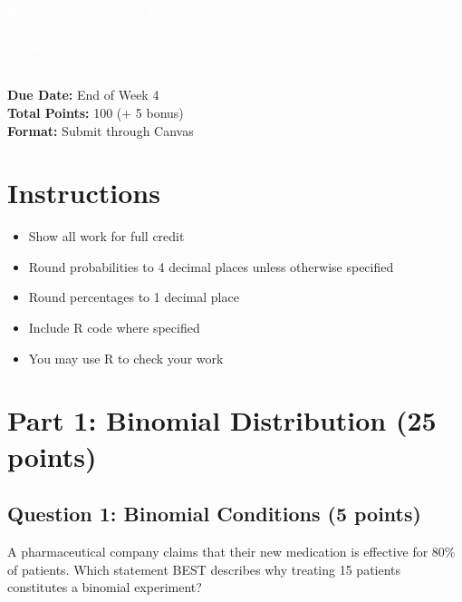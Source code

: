 \documentclass[11pt]{article}
\title{}
\author{}
\date{}
\begin{document}
\begin{tcolorbox}[colback=osaorange,colframe=black,boxrule=2pt,arc=0pt,left=3pt,right=3pt,top=6pt,bottom=6pt,boxsep=2pt]
\centering
\textcolor{white}{\textbf{\Large H524 Introduction to Biostatistics}}\\
\textcolor{white}{\textbf{\Large Week 3: Probability Distributions and Sampling}}\\
\textcolor{white}{\textbf{\Large Homework Assignment}}\\
\textcolor{white}{\textbf{\Large Fall 2025}}
\end{tcolorbox}

\vspace{8pt}

\noindent\textbf{Due Date:} End of Week 4\\
\textbf{Total Points:} 100 (+ 5 bonus)\\
\textbf{Format:} Submit through Canvas

\section*{Instructions}

\begin{itemize}
\item Show all work for full credit
\item Round probabilities to 4 decimal places unless otherwise specified
\item Round percentages to 1 decimal place
\item Include R code where specified
\item You may use R to check your work
\end{itemize}

\section{Part 1: Binomial Distribution (25 points)}

\subsection*{Question 1: Binomial Conditions (5 points)}

A pharmaceutical company claims that their new medication is effective for 80\% of patients. Which statement BEST describes why treating 15 patients constitutes a binomial experiment?
\end{document}
